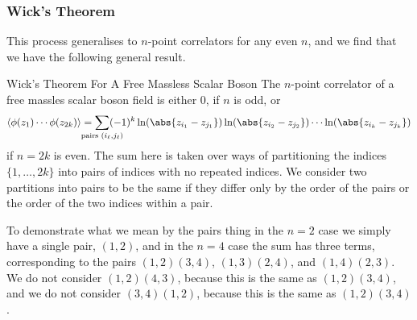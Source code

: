 \documentclass[fleqn]{NotesClass}
\DeclarePairedDelimiter{\correlator}{\langle}{\rangle}
\begin{document}
    \subsubsection{Wick's Theorem}
    This process generalises to \(n\)-point correlators for any even \(n\), and we find that we have the following general result.
    
    \begin{thm}{Wick's Theorem For A Free Massless Scalar Boson}{}
        The \(n\)-point correlator of a free massles scalar boson field is either 0, if \(n\) is odd, or
        \begin{equation*}
            \correlator{\phi(z_1) \dotsm \phi(z_{2k})} = \sum_{\mathclap{\text{pairs } (i_\ell, j_{\ell})}} (-1)^k \ln(\abs{z_{i_1} - z_{j_1}}) \ln(\abs{z_{i_2} - z_{j_2}}) \dotsm \ln(\abs{z_{i_k} - z_{j_k}})
        \end{equation*}
        if \(n = 2k\) is even.
        The sum here is taken over ways of partitioning the indices \(\{1, \dotsc, 2k\}\) into pairs of indices with no repeated indices.
        We consider two partitions into pairs to be the same if they differ only by the order of the pairs or the order of the two indices within a pair.
    \end{thm}
    
    To demonstrate what we mean by the pairs thing in the \(n = 2\) case we simply have a single pair, \((1, 2)\), and in the \(n = 4\) case the sum has three terms, corresponding to the pairs \((1, 2)(3, 4)\), \((1, 3)(2, 4)\), and \((1, 4)(2, 3)\).
    We do not consider \((1, 2)(4, 3)\), because this is the same as \((1, 2)(3, 4)\), and we do not consider \((3, 4)(1, 2)\), because this is the same as \((1, 2)(3, 4)\).
    
\end{document}
